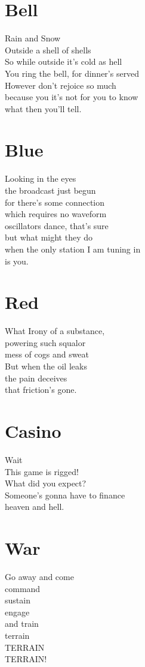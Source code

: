 \documentclass[a4paper,twoside, openany]{book}
\newenvironment{Verse}
  {\center\varwidth{\linewidth}\fontsize{18}{21.6}\selectfont}
  {\endvarwidth\endcenter}
\begin{document}
\chapter{Bell}
\begin{Verse}
    Rain and Snow\\
    Outside a shell of shells\\
    So while outside it’s cold as hell\\
    You ring the bell, for dinner’s served\\
    However don’t rejoice so much\\
    because you it’s not for you to know\\
    what then you’ll tell.
\end{Verse}

\chapter{Blue}
\begin{Verse}
    Looking in the eyes\\
    the broadcast just begun\\
    for there's some connection\\
    which requires no waveform\\
    oscillators dance, that's sure\\
    but what might they do\\
    when the only station I am tuning in\\
    is you.
\end{Verse}

\chapter{Red}
\begin{Verse}
    What Irony of a substance,\\
    powering such squalor\\
    mess of cogs and sweat\\
    But when the oil leaks\\
    the pain deceives\\
    that friction's gone.\\
\end{Verse}

\chapter{Casino}
\begin{Verse}
    Wait\\
    This game is rigged!\\
    What did you expect?\\
    Someone's gonna have to finance\\
    heaven and hell.
\end{Verse}

\chapter{War}
\begin{Verse}
    Go away and come\\
    command\\
    sustain\\
    engage\\
    and train\\
    terrain\\
    TERRAIN\\
    TERRAIN!
\end{Verse}
\end{document}
